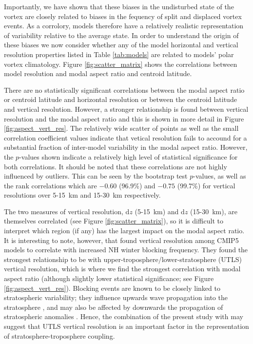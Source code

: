 Importantly, we have shown that these biases in the undisturbed state of the
vortex are closely related to biases in the fequency of split and displaced
vortex events. As a corrolory, models therefore have a relatively realistic
representation of variability relative to the average state. In order to
understand the origin of these biases we now consider whether any of the model
horizontal and vertical resolution properties listed in Table \ref{tab:models}
are related to models' polar vortex climatology. Figure \ref{fig:scatter_matrix}
shows the correlations between model resolution and modal aspect ratio and
centroid latitude. 

There are no statistically significant correlations between the modal aspect
ratio or centroid latitude and horizontal resolution or between the centroid
latitude and vertical resolution. However, a stronger relationship is found
between vertical resolution and the modal aspect ratio and this is shown in more
detail in Figure \ref{fig:aspect_vert_res}. The relatively wide scatter of
points as well as the small correlation coefficient values indicate that vetical
resolution fails to accound for a substantial fraction of inter-model
variability in the modal aspect ratio. However, the $p$-values shown indicate a
relatively high level of statistical significance for both correlations. It
should be noted that these correlations are not highly influenced by
outliers. This can be seen by the bootstrap test $p$-values, as well as the rank
correlations which are $-0.60$ (96.9\%) and $-0.75$ (99.7\%) for vertical
resolutions over 5-15~km and 15-30~km respectively.  

The two measures of vertical resolution, $\mathrm{d}z$ (5-15~km) and
$\mathrm{d}z$ (15-30~km), are themselves correlated (see Figure
\ref{fig:scatter_matrix}), so it is difficult to interpret which region (if any)
has the largest impact on the modal aspect ratio. It is interesting to note,
however, that \citet{Anstey2013} found vertical resolution among CMIP5 models to
correlate with increased NH winter blocking frequency. They found the strongest
relationship to be with upper-troposphere/lower-stratosphere (UTLS) vertical
resolution, which is where we find the strongest correlation with modal aspect
ratio (although slightly lower statistical significance; see Figure
\ref{fig:aspect_vert_res}). Blocking events are known to be closely linked to
stratospheric variability; they influence upwards wave propagation into the
stratosphere \citep{Polvani2004,Woollings2010c}, and may also be affected by
downwards the propagation of stratospheric anomalies
\citep{Tomassini2012,Mitchell2013,Vial2013}. Hence, the combination of the
present study with \citet{Anstey2013} may suggest that UTLS vertical resolution
is an important factor in the representation of stratosphere-troposphere
coupling.

